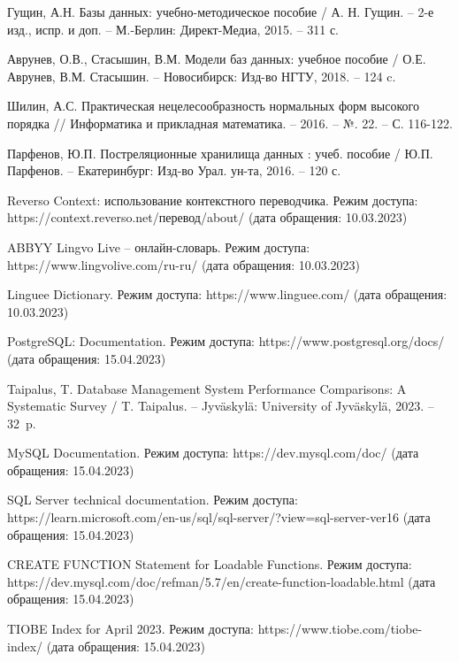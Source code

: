 \begin{thebibliography}{}
	Гущин, А.Н. Базы данных: учебно-методическое пособие / А. Н. Гущин. -- 2-е изд., испр. и доп. -- М.-Берлин: Директ-Медиа, 2015. -- 311 с.
	
	Аврунев, О.В., Стасышин, В.М. Модели баз данных: учебное пособие / О.Е. Аврунев, В.М. Стасышин. -- Новосибирск: Изд-во НГТУ, 2018. -- 124 c.
	
	Шилин, А.С. Практическая нецелесообразность нормальных форм высокого порядка // Информатика и прикладная математика. -- 2016. -- №. 22. -- С. 116-122.
	
	Парфенов, Ю.П. Постреляционные хранилища данных : учеб. пособие / Ю.П. Парфенов. -- Екатеринбург: Изд-во Урал. ун-та, 2016. -- 120 с.
    
    Reverso Context: использование контекстного переводчика. Режим доступа: https://context.reverso.net/перевод/about/ (дата обращения: 10.03.2023)
    
    ABBYY Lingvo Live -- онлайн-словарь. Режим доступа: https://www.lingvolive.com/ru-ru/ (дата обращения: 10.03.2023)
    
    Linguee Dictionary. Режим доступа: https://www.linguee.com/ (дата обращения: 10.03.2023)
    
    PostgreSQL: Documentation. Режим доступа: https://www.postgresql.org/docs/ (дата обращения: 15.04.2023)
    
    Taipalus, T. Database Management System Performance Comparisons: A Systematic Survey / T. Taipalus. -- Jyväskylä: University of Jyväskylä, 2023. -- 32~p.
    
    MySQL Documentation. Режим доступа: https://dev.mysql.com/doc/ (дата обращения: 15.04.2023)
    
    SQL Server technical documentation. Режим доступа: https://learn.microsoft.com/en-us/sql/sql-server/?view=sql-server-ver16 (дата обращения: 15.04.2023)
    
    CREATE FUNCTION Statement for Loadable Functions. Режим доступа: https://dev.mysql.com/doc/refman/5.7/en/create-function-loadable.html (дата обращения: 15.04.2023)
    
    TIOBE Index for April 2023. Режим доступа: https://www.tiobe.com/tiobe-index/ (дата обращения: 15.04.2023)
    

\end{thebibliography}
